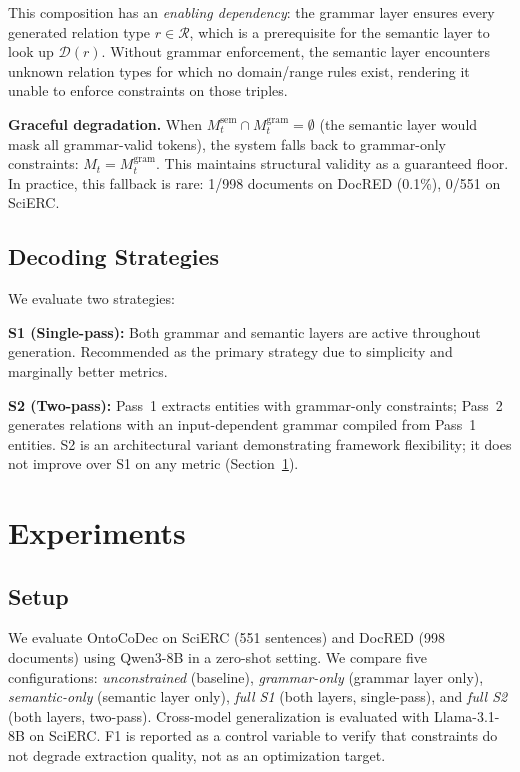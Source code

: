 \documentclass[11pt,a4paper]{article}
\newcommand{\sys}{OntoCoDec}
\begin{document}
This composition has an \emph{enabling dependency}: the grammar layer ensures every generated relation type $r \in \mathcal{R}$, which is a prerequisite for the semantic layer to look up $\mathcal{D}(r)$.
Without grammar enforcement, the semantic layer encounters unknown relation types for which no domain/range rules exist, rendering it unable to enforce constraints on those triples.

\textbf{Graceful degradation.}
When $M_t^{\text{sem}} \cap M_t^{\text{gram}} = \emptyset$ (the semantic layer would mask all grammar-valid tokens), the system falls back to grammar-only constraints: $M_t = M_t^{\text{gram}}$.
This maintains structural validity as a guaranteed floor.
In practice, this fallback is rare: 1/998 documents on DocRED (0.1\%), 0/551 on SciERC.

\subsection{Decoding Strategies}

We evaluate two strategies:

\noindent\textbf{S1 (Single-pass):} Both grammar and semantic layers are active throughout generation. Recommended as the primary strategy due to simplicity and marginally better metrics.

\noindent\textbf{S2 (Two-pass):} Pass~1 extracts entities with grammar-only constraints; Pass~2 generates relations with an input-dependent grammar compiled from Pass~1 entities.
S2 is an architectural variant demonstrating framework flexibility; it does not improve over S1 on any metric (Section~\ref{sec:exp}).

\section{Experiments}
\label{sec:exp}

\subsection{Setup}

We evaluate \sys{} on SciERC (551 sentences) and DocRED (998 documents) using Qwen3-8B in a zero-shot setting.
We compare five configurations: \emph{unconstrained} (baseline), \emph{grammar-only} (grammar layer only), \emph{semantic-only} (semantic layer only), \emph{full S1} (both layers, single-pass), and \emph{full S2} (both layers, two-pass).
Cross-model generalization is evaluated with Llama-3.1-8B on SciERC.
F1 is reported as a control variable to verify that constraints do not degrade extraction quality, not as an optimization target.
\end{document}

